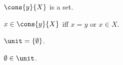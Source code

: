 \begin{signature}\label{example_cons}
    $\cons{y}{X}$ is a set.
\end{signature}

\begin{axiom}\label{cons}
    $x\in \cons{y}{X}$ iff $x = y$ or $x\in X$.
\end{axiom}

\begin{definition}\label{unit}
    $\unit = \{\emptyset\}$.
\end{definition}

\begin{proposition}\label{emptyset_in_unit}
    $\emptyset\in\unit$.
\end{proposition}
